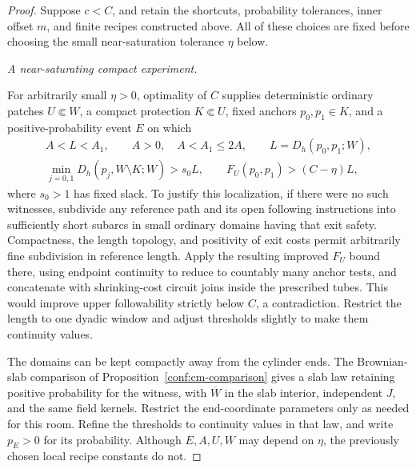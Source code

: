 \begin{proof}
Suppose $c<C$, and retain the shortcuts, probability tolerances, inner
offset $m$, and finite recipes constructed above. All of these choices are
fixed before choosing the small near-saturation tolerance $\eta$ below.

\smallskip\noindent\emph{A near-saturating compact experiment.}\par
For arbitrarily small $\eta>0$, optimality of $C$ supplies deterministic
ordinary patches $U\Subset W$, a compact protection $K\Subset U$, fixed
anchors $p_0,p_1\in K$, and a positive-probability event $E$ on which
\begin{equation}\label{metric:saturation-event}
 \begin{gathered}
 A<L<A_1,\qquad A>0,\quad A<A_1\le2A,\qquad
 L=D_h(p_0,p_1;W),\\
 \min_{j=0,1}D_h(p_j,W\setminus K;W)>s_0L,\qquad
 F_U(p_0,p_1)>(C-\eta)L,
 \end{gathered}
\end{equation}
where $s_0>1$ has fixed slack. To justify this localization, if there were
no such witnesses, subdivide any reference path and its open following
instructions into sufficiently short subarcs in small ordinary domains
having that exit safety. Compactness, the length topology, and positivity
of exit costs permit arbitrarily fine subdivision in reference length.
Apply the resulting improved $F_U$ bound there, using endpoint continuity
to reduce to countably many anchor tests, and concatenate with
shrinking-cost circuit joins inside the prescribed tubes. This would
improve upper followability strictly below $C$, a contradiction. Restrict
the length to one dyadic window and adjust thresholds slightly to make
them continuity values.

The domains can be kept compactly away from the cylinder ends. The
Brownian-slab comparison of Proposition~\ref{conf:cm-comparison} gives a slab law
retaining positive probability for the witness, with $\overline W$ in
the slab interior, independent $J$, and the same field kernels. Restrict
the end-coordinate parameters only as needed for this room. Refine the
thresholds to continuity values in that law, and write $p_E>0$ for its
probability. Although $E,A,U,W$ may depend on $\eta$, the previously
chosen local recipe constants do not.


\end{proof}
